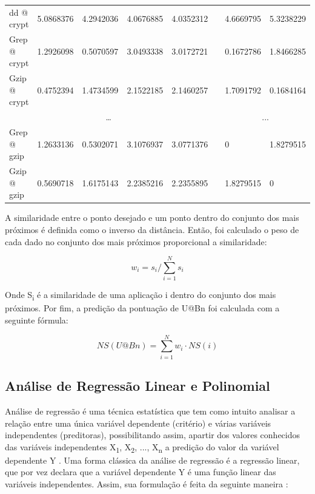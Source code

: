 \begin{table}[H]
{\begin{tabular}{|l|l|l|l|l|l|l|l|}
dd @ crypt   & 5.0868376    & 4.2942036    & 4.0676885 & 4.0352312 &                     & 4.6669795           & 5.3238229           \\ \cline{1-5} \cline{7-8} 
Grep @ crypt & 1.2926098    & 0.5070597    & 3.0493338 & 3.0172721 &                     & 0.1672786           & 1.8466285           \\ \cline{1-5} \cline{7-8} 
Gzip @ crypt & 0.4752394    & 1.4734599    & 2.1522185 & 2.1460257 &                     & 1.7091792           & 0.1684164           \\ \cline{1-5} \cline{7-8} 
\multicolumn{5}{|c|}{\multirow{2}{*}{…}}                           &                     & \multicolumn{2}{c|}{\multirow{2}{*}{...}} \\
\multicolumn{5}{|c|}{}                                             &                     & \multicolumn{2}{c|}{}                     \\ \cline{1-5} \cline{7-8} 
Grep @ gzip  & 1.2633136    & 0.5302071    & 3.1076937 & 3.0771376 &                     & 0                   & 1.8279515           \\ \cline{1-5} \cline{7-8} 
Gzip @ gzip  & 0.5690718    & 1.6175143    & 2.2385216 & 2.2355895 &                     & 1.8279515           & 0                   \\ \hline
\end{tabular}}
\end{table}

 A similaridade entre o ponto desejado e um ponto dentro do conjunto dos mais próximos é definida como o inverso da distância. Então, foi calculado o peso de cada dado no conjunto dos mais próximos proporcional a similaridade:

\begin{equation}
\label{eq:prediction} 
w_i = s_i / \sum\limits_{i=1}^{N}s_i
\end{equation}

Onde S\textsubscript{i} é a similaridade de uma aplicação i dentro do conjunto dos mais próximos. Por fim, a predição da pontuação de U@Bn foi calculada com a seguinte fórmula:

\begin{equation}
\label{eq:simi} 
NS(U@Bn) = \sum\limits_{i=1}^{N}w_i \cdot NS(i)
\end{equation}

\subsection{Análise de Regressão Linear e Polinomial}
Análise de regressão é uma técnica estatística que tem como intuito analisar a relação entre uma única variável dependente (critério) e várias variáveis independentes (preditoras), possibilitando assim, apartir dos valores conhecidos das variáveis independentes X\textsubscript{1}, X\textsubscript{2}, ..., X\textsubscript{n} a predição do valor da variável dependente Y \cite{hair}. Uma forma clássica da análise de regressão é a regressão linear, que por vez declara que a variável dependente Y é uma função linear das variáveis independentes. Assim, sua formulação é feita da seguinte maneira \cite{johnson1988}:

